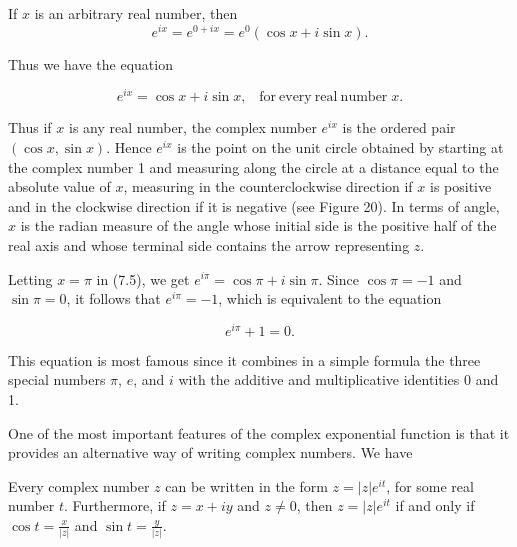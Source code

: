 \noindent If $x$ is an arbitrary real number, then
$$
e^{ix} = e^{0+ix} = e^{0}(\cos x + i \sin x).
$$

\noindent Thus we have the equation 

\begin{theorem} %
$$
e^{ix} = \cos x + i \sin x,  \;\;\;\mathrm{for~every~real~number}\; x.
$$
\end{theorem}


Thus if $x$ is any real number, the complex number $e^{ix}$ is the ordered pair 
$(\cos x, \sin x)$. Hence $e^{ix}$ is the point on the unit circle obtained by starting 
at the complex number 1 and measuring along the circle at a distance equal to the 
absolute value of $x$, measuring in the counterclockwise direction if $x$ is positive 
and in the clockwise direction if it is negative (see Figure 20). In terms of angle, 
$x$ is the radian measure of the angle whose initial side is the
positive half of the real axis and whose terminal side contains the arrow representing $z$.

Letting $x = \pi$ in (7.5), we get $e^{i\pi} = \cos \pi + i \sin \pi$. Since $\cos \pi = -1$ and 
$\sin \pi = 0$, it follows that $e^{i\pi} = - 1$, which is equivalent to the equation

$$
 e^{i \pi} + 1 = 0 .
$$

\noindent This equation is most famous since it combines in a simple formula the three special numbers $\pi$, $e$, and $i$ with the additive and multiplicative identities 0 and 1.

One of the most important features of the complex exponential function is that it provides an
alternative way of writing complex numbers. We have

\begin{theorem} %
Every complex number $z$ can be written in the form $z = |z| e^{it}$, for some real number $t$.
Furthermore, if $z = x + iy$ and $z \neq 0$, then $z = |z| e^{it}$ if and only if
 $\cos t = \frac{x}{|z|}$ and $\sin t = \frac{y}{|z|}$.
\end{theorem}



